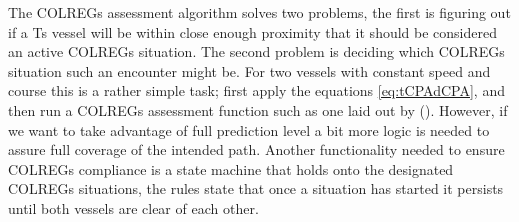 

The COLREGs assessment algorithm solves two problems, the first is figuring out if a \gls{Ts} vessel will be within close enough proximity that it should be considered
an active COLREGs situation. The second problem is deciding which COLREGs situation such an encounter might be. For two vessels with constant speed and course this is a rather
simple task; first apply the equations \eqref{eq:tCPAdCPA}, and then run a COLREGs assessment function such as one laid out by (\cite{Thyri2021b}). However, if we want
to take advantage of full prediction level a bit more logic is needed to assure full coverage of the intended path. Another functionality needed to ensure COLREGs compliance
is a state machine that holds onto the designated COLREGs situations, the rules state that once a situation has started it persists until both vessels are clear of each other.

